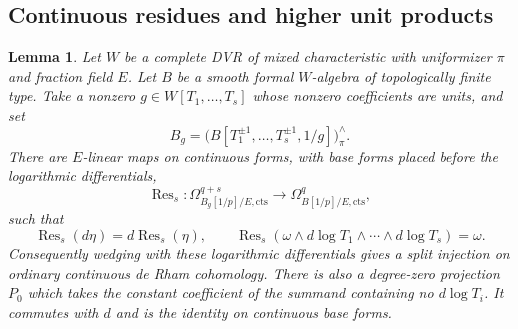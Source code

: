 \documentclass[11pt,a4paper]{amsart}
\numberwithin{equation}{section}
\newtheorem{lemma}[theorem]{Lemma}
\theoremstyle{definition}
\theoremstyle{remark}
\begin{document}
\subsection{Continuous residues and higher unit products}

\begin{lemma}
\label{d3:lem:continuouslaurentresidue}
Let $W$ be a complete DVR of mixed characteristic with uniformizer
$\pi$ and fraction field $E$. Let $B$ be a smooth formal $W$-algebra
of topologically finite type. Take a nonzero
$g\in W[T_1,\ldots,T_s]$ whose nonzero coefficients are units, and set
\[
 B_g=\bigl(B[T_1^{\pm1},\ldots,T_s^{\pm1},1/g]\bigr)^{\wedge}_{\pi}.
\]
There are $E$-linear maps on continuous forms, with base forms
placed before the logarithmic differentials,
\[
 \operatorname{Res}_s:
 \Omega^{q+s}_{B_g[1/p]/E,\mathrm{cts}}
       \longrightarrow\Omega^q_{B[1/p]/E,\mathrm{cts}},
\]
such that
\[
 \operatorname{Res}_s(d\eta)=d\operatorname{Res}_s(\eta),\qquad
 \operatorname{Res}_s\left(
 \omega\wedge d\log T_1\wedge\cdots\wedge d\log T_s\right)=\omega.
\]
Consequently wedging with these logarithmic differentials gives
a split injection on ordinary continuous de Rham cohomology.
There is also a degree-zero projection $P_0$ which takes the
constant coefficient of the summand containing no $d\log T_i$.
It commutes with $d$ and is the identity on continuous base forms.
\end{lemma}
\end{document}
